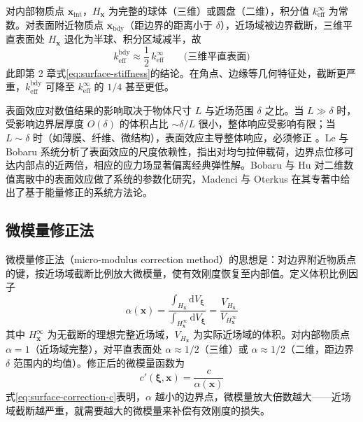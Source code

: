 对内部物质点 $\mathbf{x}_{\mathrm{int}}$，$H_{\mathbf{x}}$ 为完整的球体（三维）或圆盘（二维），积分值 $k_{\mathrm{eff}}^{\infty}$ 为常数。对表面附近物质点 $\mathbf{x}_{\mathrm{bdy}}$（距边界的距离小于 $\delta$），近场域被边界截断，三维平直表面处 $H_{\mathbf{x}}$ 退化为半球、积分区域减半，故
\begin{equation}
k_{\mathrm{eff}}^{\mathrm{bdy}} \approx \frac{1}{2}\,k_{\mathrm{eff}}^{\infty} \qquad \text{(三维平直表面)}
\label{eq:surface-stiffness-recall}
\end{equation}
此即第 2 章式\eqref{eq:surface-stiffness}的结论。在角点、边缘等几何特征处，截断更严重，$k_{\mathrm{eff}}^{\mathrm{bdy}}$ 可降至 $k_{\mathrm{eff}}^{\infty}$ 的 $1/4$ 甚至更低。

表面效应对数值结果的影响取决于物体尺寸 $L$ 与近场范围 $\delta$ 之比。当 $L\gg\delta$ 时，受影响边界层厚度 $O(\delta)$ 的体积占比 $\sim\delta/L$ 很小，整体响应受影响有限；当 $L\sim\delta$ 时（如薄膜、纤维、微结构），表面效应主导整体响应，必须修正 \cite{LeBobaru2018}。Le 与 Bobaru \cite{LeBobaru2018} 系统分析了表面效应的尺度依赖性，指出对均匀拉伸载荷，边界点位移可达内部点的近两倍，相应的应力场显著偏离经典弹性解。Bobaru 与 Hu \cite{BobaruHu2012} 对二维数值离散中的表面效应做了系统的参数化研究，Madenci 与 Oterkus \cite{MadenciOterkus2014} 在其专著中给出了基于能量修正的系统方法论。

\subsection{微模量修正法}

微模量修正法（micro-modulus correction method）的思想是：对边界附近物质点的键，按近场域截断比例放大微模量，使有效刚度恢复至内部值。定义体积比例因子
\begin{equation}
\alpha(\mathbf{x}) = \frac{\displaystyle\int_{H_{\mathbf{x}}} \mathrm{d}V_{\boldsymbol{\xi}}}
{\displaystyle\int_{H_{\mathbf{x}}^{\infty}} \mathrm{d}V_{\boldsymbol{\xi}}}
= \frac{V_{H_{\mathbf{x}}}}{V_{H_{\mathbf{x}}^{\infty}}}
\label{eq:surface-alpha}
\end{equation}
其中 $H_{\mathbf{x}}^{\infty}$ 为无截断的理想完整近场域，$V_{H_{\mathbf{x}}}$ 为实际近场域的体积。对内部物质点 $\alpha=1$（近场域完整），对平直表面处 $\alpha\approx 1/2$（三维）或 $\alpha\approx 1/2$（二维，距边界 $\delta$ 范围内的均值）。修正后的微模量函数为
\begin{equation}
c'(\boldsymbol{\xi},\mathbf{x}) = \frac{c}{\alpha(\mathbf{x})}
\label{eq:surface-correction-c}
\end{equation}
式\eqref{eq:surface-correction-c}表明，$\alpha$ 越小的边界点，微模量放大倍数越大——近场域截断越严重，就需要越大的微模量来补偿有效刚度的损失。

